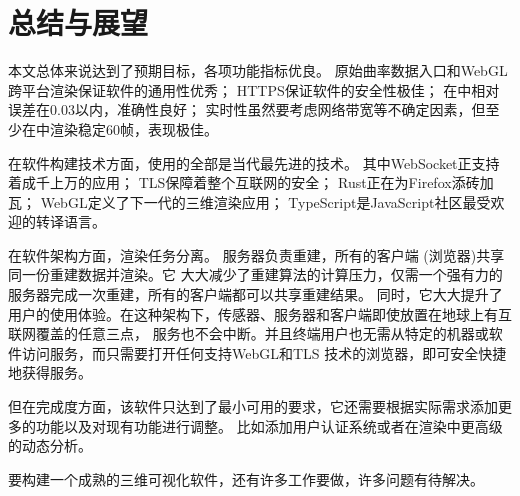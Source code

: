 \clearpage

\section{总结与展望}
本文总体来说达到了预期目标，各项功能指标优良。
原始曲率数据入口和WebGL跨平台渲染保证软件的通用性优秀；
HTTPS保证软件的安全性极佳；
在中相对误差在$0.03$以内，准确性良好；
实时性虽然要考虑网络带宽等不确定因素，但至少在中渲染稳定60帧，表现极佳。

在软件构建技术方面，使用的全部是当代最先进的技术。
其中WebSocket正支持着成千上万的应用；
TLS保障着整个互联网的安全；
Rust正在为Firefox添砖加瓦；
WebGL定义了下一代的三维渲染应用；
TypeScript是JavaScript社区最受欢迎的转译语言。

在软件架构方面，渲染任务分离。
服务器负责重建，所有的客户端 (浏览器)共享同一份重建数据并渲染。它
大大减少了重建算法的计算压力，仅需一个强有力的服务器完成一次重建，所有的客户端都可以共享重建结果。 
同时，它大大提升了用户的使用体验。在这种架构下，传感器、服务器和客户端即使放置在地球上有互联网覆盖的任意三点，
服务也不会中断。并且终端用户也无需从特定的机器或软件访问服务，而只需要打开任何支持WebGL和TLS
技术的浏览器，即可安全快捷地获得服务。

但在完成度方面，该软件只达到了最小可用的要求，它还需要根据实际需求添加更多的功能以及对现有功能进行调整。
比如添加用户认证系统或者在渲染中更高级的动态分析。

要构建一个成熟的三维可视化软件，还有许多工作要做，许多问题有待解决。
